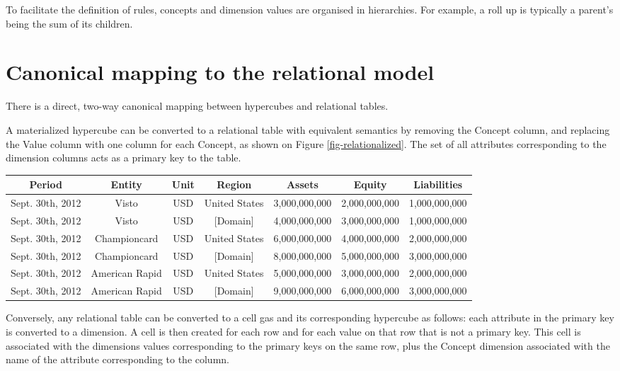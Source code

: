 \documentclass{acm_proc_article-sp}
\begin{document}
To facilitate the definition of rules, concepts and dimension values are organised in hierarchies. For example, a roll up is typically a parent's being the sum of its children.

\section{Canonical mapping to the relational model}
\label{section-relational-mapping}
There is a direct, two-way canonical mapping between hypercubes and relational tables.

A materialized hypercube can be converted to a relational table with equivalent semantics by removing the Concept column, and replacing the Value column with one column for each Concept, as shown on Figure \ref{fig-relationalized}. The set of all attributes corresponding to the dimension columns acts as a primary key to the table.

\begin{figure*}
\caption{A relational table corresponding to a hypercube}
\label{fig-relationalized}
\begin{tabular}{|c|c|c|c||c|c|c|}
\hline
Period & Entity & Unit & Region & Assets & Equity & Liabilities \\
\hline
Sept. 30th, 2012 & Visto & USD & United States & 3,000,000,000 & 2,000,000,000 & 1,000,000,000 \\
Sept. 30th, 2012 & Visto & USD & [Domain] & 4,000,000,000 & 3,000,000,000 & 1,000,000,000 \\

Sept. 30th, 2012 & Championcard & USD & United States & 6,000,000,000 & 4,000,000,000 & 2,000,000,000 \\

Sept. 30th, 2012 & Championcard & USD & [Domain] & 8,000,000,000 & 5,000,000,000 & 3,000,000,000 \\

Sept. 30th, 2012 & American Rapid & USD & United States & 5,000,000,000 & 3,000,000,000 & 2,000,000,000 \\

Sept. 30th, 2012 & American Rapid & USD & [Domain] & 9,000,000,000 & 6,000,000,000 & 3,000,000,000 \\

\hline
\end{tabular}
\end{figure*}

Conversely, any relational table can be converted to a cell gas and its corresponding hypercube as follows: each attribute in the primary key is converted to a dimension. A cell is
then created for each row and for each value on that row that is not a primary key. This cell is associated with the dimensions values corresponding to the primary keys on the same row, plus the Concept dimension associated with the name of the attribute corresponding to the column.
\end{document}
